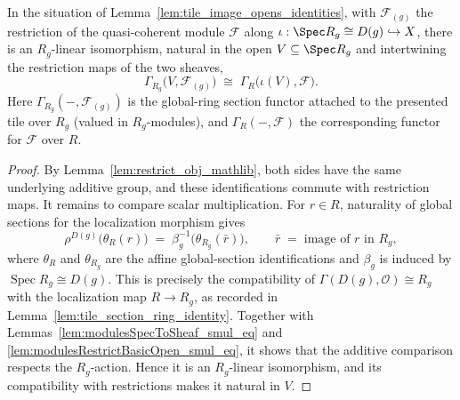 \begin{lemma}
  \label{lem:tile_section_comparison}
  In the situation of Lemma~\ref{lem:tile_image_opens_identities}, with
  \(\mathcal{F}_{(g)}\) the restriction of the quasi-coherent module
  \(\mathcal{F}\) along \(\iota : \Spec R_g \cong D(g) \hookrightarrow X\), there is an \(R_g\)-linear
  isomorphism, natural in the open \(V \subseteq \Spec R_g\) and intertwining the restriction maps of the
  two sheaves,
  \[
    \Gamma_{R_g}\bigl(V, \mathcal{F}_{(g)}\bigr) \;\cong\; \Gamma_R\bigl(\iota(V), \mathcal{F}\bigr).
  \]
  Here \(\Gamma_{R_g}(-, \mathcal{F}_{(g)})\) is the global-ring section functor attached to the
  presented tile over \(R_g\) (valued in \(R_g\)-modules), and \(\Gamma_R(-, \mathcal{F})\) the
  corresponding functor for \(\mathcal{F}\) over \(R\).
\end{lemma}
\begin{proof}
  By Lemma~\ref{lem:restrict_obj_mathlib}, both sides have the same underlying additive
  group, and these identifications commute with restriction maps. It remains to compare
  scalar multiplication. For \(r\in R\), naturality of global sections for the
  localization morphism gives
  \[
    \rho^{D(g)}\bigl(\theta_R(r)\bigr)
      \;=\;
    \beta_g^{-1}\bigl(\theta_{R_g}(\bar r)\bigr),
    \qquad \bar r \;=\; \text{image of } r \text{ in } R_g,
  \]
  where \(\theta_R\) and \(\theta_{R_g}\) are the affine global-section
  identifications and \(\beta_g\) is induced by
  \(\operatorname{Spec}R_g\cong D(g)\). This is precisely the compatibility of
  \(\Gamma(D(g),\mathcal O)\cong R_g\) with the localization map \(R\to R_g\), as
  recorded in Lemma~\ref{lem:tile_section_ring_identity}. Together with
  Lemmas~\ref{lem:modulesSpecToSheaf_smul_eq} and
  \ref{lem:modulesRestrictBasicOpen_smul_eq}, it shows that the additive comparison
  respects the \(R_g\)-action. Hence it is an \(R_g\)-linear isomorphism, and its
  compatibility with restrictions makes it natural in \(V\).
\end{proof}

